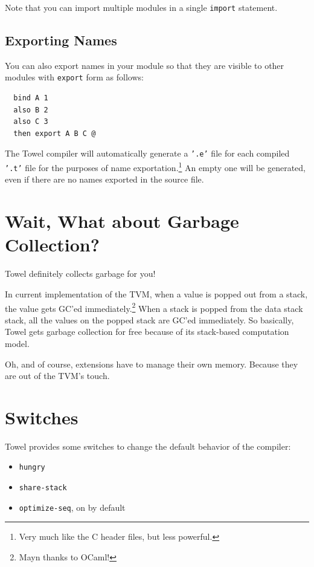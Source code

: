 \documentclass{report}
\begin{document}
Note that you can import multiple modules in a single \texttt{import} statement.

\subsection{Exporting Names}

You can also export names in your module so that they are visible to other modules with \texttt{export} form as follows:

\begin{mdframed}[style=example]
\begin{verbatim}
  bind A 1
  also B 2
  also C 3
  then export A B C @
\end{verbatim}
\end{mdframed}

The Towel compiler will automatically generate a \texttt{'.e'} file for each compiled \texttt{'.t'} file for the purposes of name exportation.\footnote{Very much like the C header files, but less powerful.} An empty one will be generated, even if there are no names exported in the source file.

\section{Wait, What about Garbage Collection?}

Towel definitely collects garbage for you!

In current implementation of the TVM, when a value is popped out from a stack, the value gets GC'ed immediately.\footnote{Mayn thanks to OCaml!} When a stack is popped from the data stack stack, all the values on the popped stack are GC'ed immediately. So basically, Towel gets garbage collection for free because of its stack-based computation model.

Oh, and of course, extensions have to manage their own memory. Because they are out of the TVM's touch.

\section{Switches}
\label{sec:switches}

Towel provides some switches to change the default behavior of the compiler:
\begin{itemize}
\item \texttt{hungry}
\item \texttt{share-stack}
\item \texttt{optimize-seq}, on by default
\end{itemize}
\end{document}
